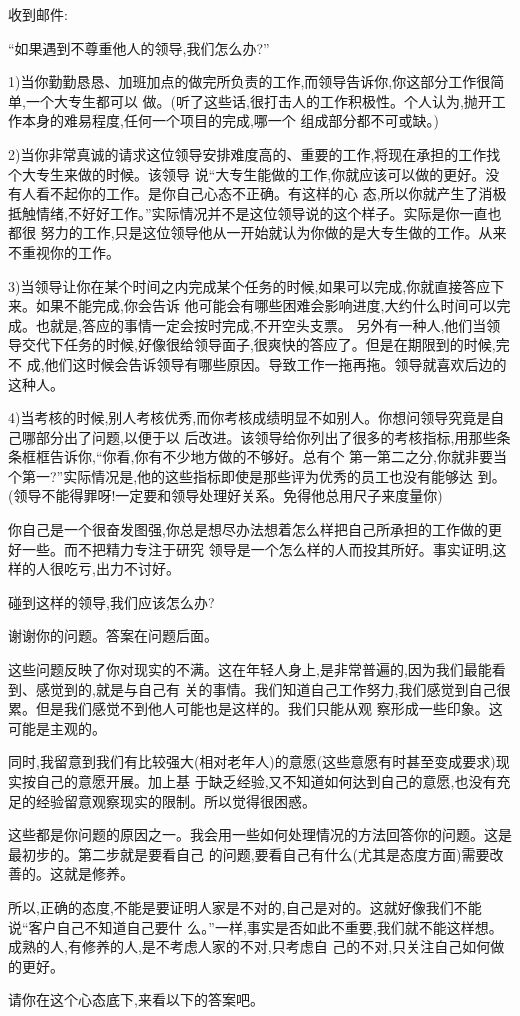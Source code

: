 \documentclass[11pt]{article}
\begin{document}
\begin{myquote}
收到邮件:

``如果遇到不尊重他人的领导,我们怎么办?''

1)当你勤勤恳恳、加班加点的做完所负责的工作,而领导告诉你,你这部分工作很简单,一个大专生都可以
做。(听了这些话,很打击人的工作积极性。个人认为,抛开工作本身的难易程度,任何一个项目的完成,哪一个
组成部分都不可或缺。)

2)当你非常真诚的请求这位领导安排难度高的、重要的工作,将现在承担的工作找个大专生来做的时候。该领导
说``大专生能做的工作,你就应该可以做的更好。没有人看不起你的工作。是你自己心态不正确。有这样的心
态,所以你就产生了消极抵触情绪,不好好工作。''实际情况并不是这位领导说的这个样子。实际是你一直也都很
努力的工作,只是这位领导他从一开始就认为你做的是大专生做的工作。从来不重视你的工作。

3)当领导让你在某个时间之内完成某个任务的时候,如果可以完成,你就直接答应下来。如果不能完成,你会告诉
他可能会有哪些困难会影响进度,大约什么时间可以完成。也就是,答应的事情一定会按时完成,不开空头支票。
另外有一种人,他们当领导交代下任务的时候,好像很给领导面子,很爽快的答应了。但是在期限到的时候,完不
成,他们这时候会告诉领导有哪些原因。导致工作一拖再拖。领导就喜欢后边的这种人。

4)当考核的时候,别人考核优秀,而你考核成绩明显不如别人。你想问领导究竟是自己哪部分出了问题,以便于以
后改进。该领导给你列出了很多的考核指标,用那些条条框框告诉你,``你看,你有不少地方做的不够好。总有个
第一第二之分,你就非要当个第一?''实际情况是,他的这些指标即使是那些评为优秀的员工也没有能够达
到。(领导不能得罪呀!一定要和领导处理好关系。免得他总用尺子来度量你)

你自己是一个很奋发图强,你总是想尽办法想着怎么样把自己所承担的工作做的更好一些。而不把精力专注于研究
领导是一个怎么样的人而投其所好。事实证明,这样的人很吃亏,出力不讨好。

碰到这样的领导,我们应该怎么办?
\end{myquote}

\begin{statement}
谢谢你的问题。答案在问题后面。

这些问题反映了你对现实的不满。这在年轻人身上,是非常普遍的,因为我们最能看到、感觉到的,就是与自己有
关的事情。我们知道自己工作努力,我们感觉到自己很累。但是我们感觉不到他人可能也是这样的。我们只能从观
察形成一些印象。这可能是主观的。

同时,我留意到我们有比较强大(相对老年人)的意愿(这些意愿有时甚至变成要求)现实按自己的意愿开展。加上基
于缺乏经验,又不知道如何达到自己的意愿,也没有充足的经验留意观察现实的限制。所以觉得很困惑。

这些都是你问题的原因之一。我会用一些如何处理情况的方法回答你的问题。这是最初步的。第二步就是要看自己
的问题,要看自己有什么(尤其是态度方面)需要改善的。这就是修养。

所以,正确的态度,不能是要证明人家是不对的,自己是对的。这就好像我们不能说``客户自己不知道自己要什
么。''一样,事实是否如此不重要,我们就不能这样想。成熟的人,有修养的人,是不考虑人家的不对,只考虑自
己的不对,只关注自己如何做的更好。

请你在这个心态底下,来看以下的答案吧。
\end{statement}
\end{document}
